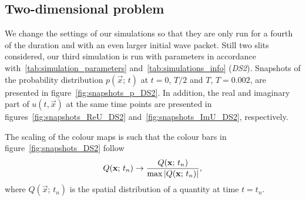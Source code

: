 \subsection{Two-dimensional problem}
    
    We change the settings of our simulations so that they are only run for a fourth of the duration and with an even larger initial wave packet. Still two slits considered, our third simulation is run with parameters in accordance with~\ref{tab:simulation_parameters} and~\ref{tab:simulations_info} (\textit{DS2}). Snapshots of the probability distribution $p(\vec{x};\, t)$ at $t=0$, $T/2$ and $T$, $T=0.002$, are presented in figure~\ref{fig:snapshots_p_DS2}. In addition, the real and imaginary part of $u(t, \vec{x})$ at the same time points are presented in figures~\ref{fig:snapshots_ReU_DS2} and~\ref{fig:snapshots_ImU_DS2}, respectively.

    The scaling of the colour maps is such that the colour bars in figure~\ref{fig:snapshots_DS2} follow
    \begin{equation}\label{eq:normalisation_cmaps}
        Q(\mathbf{x};\, t_n) \to \frac{Q(\mathbf{x};\, t_n)}{\max{\abs{Q(\mathbf{x};\, t_n)}}},
    \end{equation}
    where $Q(\vec{x};\, t_n)$ is the spatial distribution of a quantity at time $t=t_n$. 


